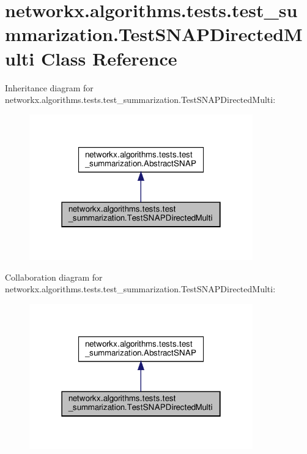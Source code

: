\hypertarget{classnetworkx_1_1algorithms_1_1tests_1_1test__summarization_1_1TestSNAPDirectedMulti}{}\section{networkx.\+algorithms.\+tests.\+test\+\_\+summarization.\+Test\+S\+N\+A\+P\+Directed\+Multi Class Reference}
\label{classnetworkx_1_1algorithms_1_1tests_1_1test__summarization_1_1TestSNAPDirectedMulti}


Inheritance diagram for networkx.\+algorithms.\+tests.\+test\+\_\+summarization.\+Test\+S\+N\+A\+P\+Directed\+Multi\+:
\nopagebreak
\begin{figure}[H]
\begin{center}
\leavevmode
\includegraphics[width=274pt]{classnetworkx_1_1algorithms_1_1tests_1_1test__summarization_1_1TestSNAPDirectedMulti__inherit__graph}
\end{center}
\end{figure}


Collaboration diagram for networkx.\+algorithms.\+tests.\+test\+\_\+summarization.\+Test\+S\+N\+A\+P\+Directed\+Multi\+:
\nopagebreak
\begin{figure}[H]
\begin{center}
\leavevmode
\includegraphics[width=274pt]{classnetworkx_1_1algorithms_1_1tests_1_1test__summarization_1_1TestSNAPDirectedMulti__coll__graph}
\end{center}
\end{figure}
